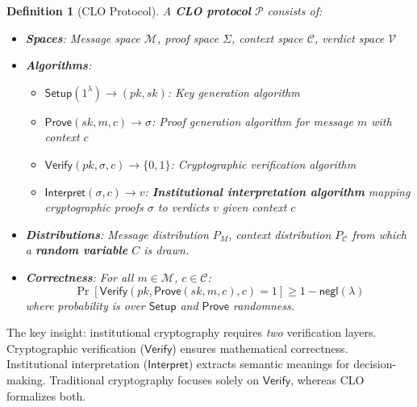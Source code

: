 \documentclass{ieeeaccess}
\newtheorem{definition}{Definition}[subsection]
\begin{document}
\begin{definition}[CLO Protocol]\label{def:clo_protocol}
A \textbf{CLO protocol} $\mathcal{P}$ consists of:
\begin{itemize}
\item \textbf{Spaces}: Message space $\mathcal{M}$, proof space $\Sigma$, context space $\mathcal{C}$, verdict space $\mathcal{V}$
\item \textbf{Algorithms}:
\begin{itemize}
\item $\mathsf{Setup}(1^\lambda) \to (pk, sk)$: Key generation algorithm
\item $\mathsf{Prove}(sk, m, c) \to \sigma$: Proof generation algorithm for message $m$ with context $c$
\item $\mathsf{Verify}(pk, \sigma, c) \to \{0,1\}$: Cryptographic verification algorithm
\item $\mathsf{Interpret}(\sigma, c) \to v$: \textbf{Institutional interpretation algorithm} mapping cryptographic proofs $\sigma$ to verdicts $v$ given context $c$

\end{itemize}
\item \textbf{Distributions}: Message distribution $P_M$, context distribution $P_\mathcal{C}$ from which a \textbf{random variable} $C$ is drawn.
\item \textbf{Correctness}: For all $m \in \mathcal{M}$, $c \in \mathcal{C}$:
\begin{equation}
\Pr[\mathsf{Verify}(pk, \mathsf{Prove}(sk,m,c), c) = 1] \geq 1 - \mathsf{negl}(\lambda)
\end{equation}
where probability is over $\mathsf{Setup}$ and $\mathsf{Prove}$ randomness.
\end{itemize}
\end{definition}

The key insight: institutional cryptography requires \emph{two} verification layers. Cryptographic verification ($\mathsf{Verify}$) ensures mathematical correctness. Institutional interpretation ($\mathsf{Interpret}$) extracts semantic meanings for decision-making. Traditional cryptography focuses solely on $\mathsf{Verify}$, whereas  CLO formalizes both.
\end{document}
